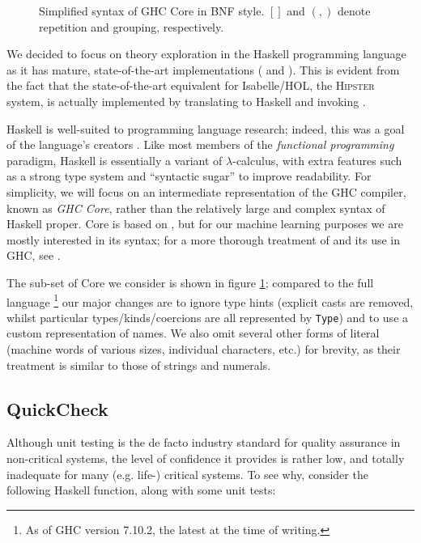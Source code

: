 \begin{figure}
  \caption{Simplified syntax of GHC Core in BNF style. $[]$ and $(,)$ denote repetition and grouping, respectively.}
  \label{fig:coresyntax}
\end{figure}

We decided to focus on theory exploration in the Haskell programming language as it has mature, state-of-the-art implementations (\qspec{} \citep{QuickSpec} and \hspec{} \citep{claessen2013automating}). This is evident from the fact that the state-of-the-art equivalent for Isabelle/HOL, the \textsc{Hipster} \citep{Hipster} system, is actually implemented by translating to Haskell and invoking \hspec{}.

Haskell is well-suited to programming language research; indeed, this was a goal of the language's creators \citep{marlow2010haskell}. Like most members of the \emph{functional programming} paradigm, Haskell is essentially a variant of $\lambda$-calculus, with extra features such as a strong type system and ``syntactic sugar'' to improve readability. For simplicity, we will focus on an intermediate representation of the \textsc{GHC} compiler, known as \emph{GHC Core}, rather than the relatively large and complex syntax of Haskell proper. Core is based on \fc{}, but for our machine learning purposes we are mostly interested in its syntax; for a more thorough treatment of \fc{} and its use in GHC, see \citep[Appendix C]{sulzmann2007system}.

The sub-set of Core we consider is shown in figure \ref{fig:coresyntax}; compared to the full language \footnote{As of GHC version 7.10.2, the latest at the time of writing.} our major changes are to ignore type hints (explicit casts are removed, whilst particular types/kinds/coercions are all represented by \texttt{Type}) and to use a custom representation of names. We also omit several other forms of literal (machine words of various sizes, individual characters, etc.) for brevity, as their treatment is similar to those of strings and numerals.

\subsection{QuickCheck}
\label{sec:quickcheck}

Although unit testing is the de facto industry standard for quality assurance in non-critical systems, the level of confidence it provides is rather low, and totally inadequate for many (e.g. life-) critical systems. To see why, consider the following Haskell function, along with some unit tests:

